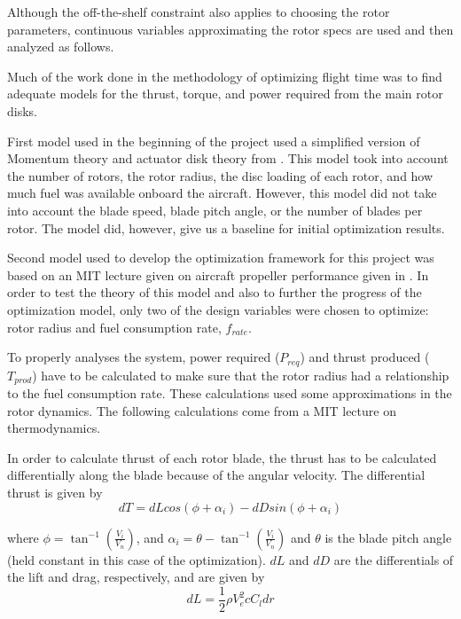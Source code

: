 \documentclass[letterpaper, 10 pt, conference]{ieeeconf}  %
\begin{document}
Although the off-the-shelf constraint also applies to choosing the rotor parameters, continuous variables approximating the rotor specs are used and then analyzed as follows. 

Much of the work done in the methodology of optimizing flight time was to find adequate models for the thrust, torque, and power required from the main rotor disks.

First model used in the beginning of the project used a simplified version of Momentum theory and actuator disk theory from \cite{helicopters2016}. This model took into account the number of rotors, the rotor radius, the disc loading of each rotor, and how much fuel was available onboard the aircraft. However, this model did not take into account the blade speed, blade pitch angle, or the number of blades per rotor. The model did, however, give us a baseline for initial optimization results.

Second model used to develop the optimization framework for this project was based on an MIT lecture given on aircraft propeller performance given in \cite{mit2016}. In order to test the theory of this model and also to further the progress of the optimization model, only two of the design variables were chosen to optimize: rotor radius and fuel consumption rate, $f_{rate}$. 

To properly analyses the system, power required ($P_{req}$) and thrust produced ($T_{prod}$) have to be calculated to make sure that the rotor radius had a relationship to the fuel consumption rate. These calculations used some approximations in the rotor dynamics. The following calculations come from a MIT lecture on thermodynamics.

In order to calculate thrust of each rotor blade, the thrust has to be calculated differentially along the blade because of the angular velocity. The differential thrust is given by 
\begin{equation}
	dT = dLcos(\phi + \alpha_i) - dDsin(\phi + \alpha_i)
\end{equation}

where $\phi = \tan^{-1}(\frac{V_i}{V_n})$, and $\alpha_i = \theta - \tan^{-1}(\frac{V_i}{V_n})$ and $\theta$ is the blade pitch angle (held constant in this case of the optimization). $dL$ and $dD$ are the differentials of the lift and drag, respectively, and are given by
\begin{equation}
	dL = \frac{1}{2}\rho V_e^2 c C_l dr
\end{equation}
\end{document}
